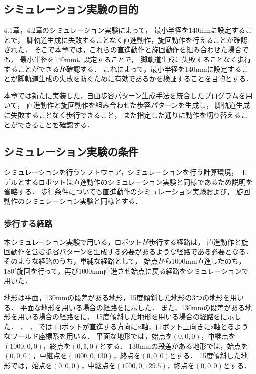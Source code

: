 
\subsection{シミュレーション実験の目的}
4.1章，4.2章のシミュレーション実験によって，
最小半径を140mmに設定することで，
脚軌道生成に失敗することなく直進動作，旋回動作を行えることが確認された．
そこで本章では，これらの直進動作と旋回動作を組み合わせた場合でも，
最小半径を140mmに設定することで，
脚軌道生成に失敗することなく歩行することができるか確認する．
これによって，最小半径を140mmに設定することが脚軌道生成の失敗を防ぐために有効であるかを検証することを目的とする．

本章では新たに実装した，自由歩容パターン生成手法を統合したプログラムを用いて，
直進動作と旋回動作を組み合わせた歩容パターンを生成し，
脚軌道生成に失敗することなく歩行できること，
また指定した通りに動作を切り替えることができることを確認する．

\subsection{シミュレーション実験の条件}
シミュレーションを行うソフトウェア，シミュレーションを行う計算環境，
モデルとするロボットは直進動作のシミュレーション実験と同様であるため説明を省略する．
歩行条件についても直進動作のシミュレーション実験および，
旋回動作のシミュレーション実験と同様とする．

\subsubsection{歩行する経路}
本シミュレーション実験で用いる，ロボットが歩行する経路は，
直進動作と旋回動作を含む歩容パターンを生成する必要があるような経路である必要となる．
そのような経路のうち，単純な経路として，
始点から1000mm直進したのち，$180^{\circ}$旋回を行って，再び1000mm直進させ始点に戻る経路をシミュレーションで用いた．

地形は平面，130mmの段差がある地形，15度傾斜した地形の3つの地形を用いる．
平面な地形を用いる場合の経路をに示した．
また，130mmの段差がある地形を用いる場合の経路をに，
15度傾斜した地形を用いる場合の経路をに示した．
，
，
では
ロボットが直進する方向にx軸，ロボット上向きにz軸とるようなワールド座標系を用いる．
平面な地形では，始点を$(0,0,0)$，中継点を$(1000,0,0)$，終点を$(0,0,0)$とする．
130mmの段差がある地形では，始点を$(0,0,0)$，中継点を$(1000,0,130)$，終点を$(0,0,0)$とする．
15度傾斜した地形では，始点を$(0,0,0)$，中継点を$(1000,0,129.5)$，終点を$(0,0,0)$とする．

